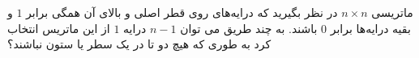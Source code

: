 \EXERCISE
ماتریسی 
$n \times n$
در نظر بگیرید که درایه‌های روی قطر اصلی و بالای آن همگی برابر 
$1$
 و بقیه درایه‌ها برابر 
$0$
  باشند. به چند طریق می توان 
$n - 1$
  درایه 
$1$
   از این ماتریس انتخاب کرد به طوری که هیچ دو تا در یک سطر یا ستون نباشند؟